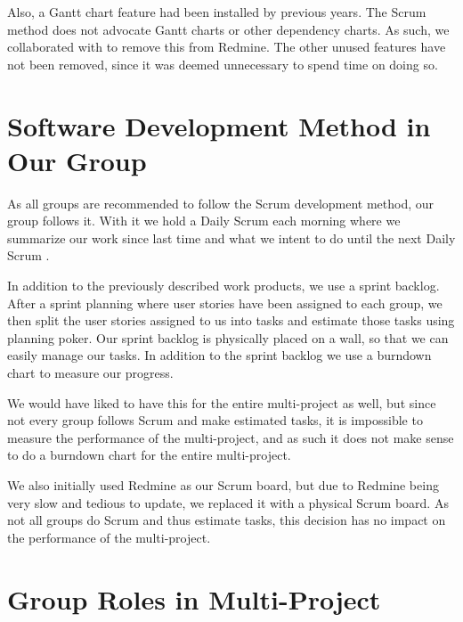 Also, a Gantt chart feature had been installed by previous years. The Scrum method does not advocate Gantt charts or other dependency charts. As such, we collaborated with  to remove this from Redmine. The other unused features have not been removed, since it was deemed unnecessary to spend time on doing so.

\section{Software Development Method in Our Group}\label{sec:swmethod_ourgroup}
As all groups are recommended to follow the Scrum development method, our group follows it. With it we hold a Daily Scrum each morning where we summarize our work since last time and what we intent to do until the next Daily Scrum .

In addition to the previously described work products, we use a sprint backlog. After a sprint planning where user stories have been assigned to each group, we then split the user stories assigned to us into tasks and estimate those tasks using planning poker. Our sprint backlog is physically placed on a wall, so that we can easily manage our tasks. In addition to the sprint backlog we use a burndown chart to measure our progress.

We would have liked to have this for the entire multi-project as well, but since not every group follows Scrum and make estimated tasks, it is impossible to measure the performance of the multi-project, and as such it does not make sense to do a burndown chart for the entire multi-project. 

We also initially used Redmine as our Scrum board, but due to Redmine being very slow and tedious to update, we replaced it with a physical Scrum board. As not all groups do Scrum and thus estimate tasks, this decision has no impact on the performance of the multi-project. 

\section{Group Roles in Multi-Project}\label{sec:multi_project_group_roles}

